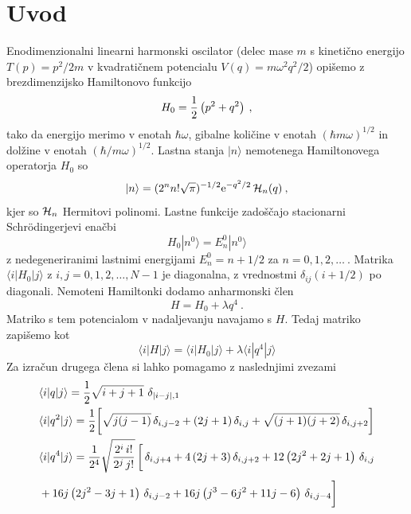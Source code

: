 \documentclass[12pt, a4paper]{article}
\begin{document}
\section{Uvod}
Enodimenzionalni linearni harmonski oscilator (delec mase $m$
s kinetično energijo $T(p)=p^2/2m$ v kvadratičnem potencialu
$V(q)=m\omega^2 q^2/2$) opišemo z brezdimenzijsko Hamiltonovo funkcijo
\begin{equation*}
  H_0 = {1\over 2} \left( p^2 + q^2 \right) \>,
\end{equation*}
tako da energijo merimo v enotah $\hbar\omega$, gibalne količine
v enotah $(\hbar m\omega)^{1/2}$ in dolžine v enotah $(\hbar/m\omega)^{1/2}$.
Lastna stanja $|n\rangle$ nemotenega Hamiltonovega operatorja $H_0$ so
\begin{equation*}
  |n\rangle = (2^n n! \sqrt{\pi})^{-1/2} \mathrm{e}^{-q^2/2}\,  {\cal H}_n (q)\>,
\end{equation*}
kjer so ${\cal H}_n$ Hermitovi polinomi.
Lastne funkcije zadoščajo stacionarni Schr\"odingerjevi enačbi
\begin{equation*}
H_0 | n^0 \rangle = E_n^0 | n^0 \rangle
\end{equation*}
z nedegeneriranimi lastnimi energijami $E_n^0 = n + 1/2$
za $n=0,1,2,\ldots~$.  Matrika $\langle i | H_0 | j\rangle$
z $i,j=0,1,2,\ldots,N-1$ je diagonalna, z vrednostmi
$\delta_{ij}(i + 1/2)$ po diagonali.  Nemoteni Hamiltonki
dodamo anharmonski člen
\begin{equation*}
H = H_0 + \lambda q^4 \>.
\end{equation*}
Matriko s tem potencialom v nadaljevanju navajamo s $H$. Tedaj matriko zapišemo kot
\begin{equation*}
  \langle  i | H | j \rangle = \langle  i | H_0 | j \rangle + \lambda \langle  i | q^4 | j \rangle
\end{equation*}
Za izračun drugega člena si lahko pomagamo z naslednjimi zvezami
\begin{align*}
  &\langle i | q | j \rangle = {1\over 2} \sqrt{i+j+1}\,\, \delta_{|i-j|,1} \\
  &\langle i|q^2|j\rangle
  = {1\over 2} \biggl[
    {\sqrt{j(j-1)}} \, \delta_{i,j-2}
  + {(2j+1)} \, \delta_{i,j}
  + {\sqrt{(j+1)(j+2)}} \, \delta_{i,j+2} \biggr] \\
  &\langle i|q^4|j\rangle
  = {1\over 2^4}\sqrt{2^i \, i!\over 2^{j} \, j! } \, \biggl[ \,
  \delta_{i,j+4} + 4\left(2j+3\right) \delta_{i,j+2}
                      + 12 \left(2j^2+2j+1\right) \, \delta_{i,j} \\[3pt]
  &+ 16j \left(2j^2-3j+1\right) \, \delta_{i,j-2}
     + 16j\left(j^3-6j^2+11j-6\right) \, \delta_{i,j-4} \biggr]
\end{align*}
\end{document}
